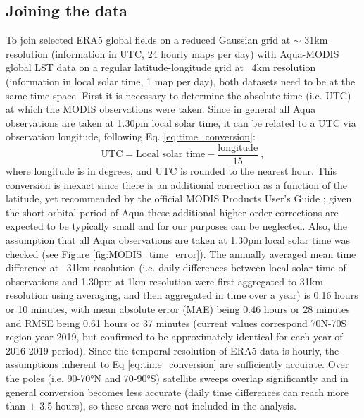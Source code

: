 \documentclass[hess, twostagejnl]{copernicus}
\begin{document}
\subsection{Joining the data}\label{sec:join}
To join selected ERA5 global fields on a reduced Gaussian grid at $\sim$ 31km resolution (information in UTC, 24 hourly maps per day) with Aqua-MODIS global LST data on a regular latitude-longitude grid at ~4km resolution (information in local solar time, 1 map per day), both datasets need to be at the same time space. First it is necessary to determine the absolute time (i.e. UTC) at which the MODIS observations were taken. Since in general all Aqua observations are taken at 1.30pm local solar time, it can be related to a UTC via observation longitude, following Eq. \ref{eq:time_conversion}:
\begin{equation}
	\text{UTC} = \text{Local solar time} - \frac{\text{longitude}}{15} \ , 
	\label{eq:time_conversion}
\end{equation}
where longitude is in degrees, and UTC is rounded to the nearest hour. This conversion is inexact since there is an additional correction as a function of the latitude, yet recommended by the official MODIS Products User’s Guide \citep{MODISusersguide}; given the short orbital period of Aqua these additional higher order corrections are expected to be typically small and for our purposes can be neglected. Also, the assumption that all Aqua observations are taken at 1.30pm local solar time was checked (see Figure \ref{fig:MODIS_time_error}). The annually averaged mean time difference at ~31km resolution (i.e. daily differences between local solar time of observations and 1.30pm at 1km resolution were first aggregated to 31km resolution using averaging, and then aggregated in time over a year) is 0.16 hours or 10 minutes, with mean absolute error (MAE) being 0.46 hours or 28 minutes and RMSE being 0.61 hours or 37 minutes (current values correspond 70N-70S region year 2019, but confirmed to be approximately identical for each year of 2016-2019 period). Since the temporal resolution of ERA5 data is hourly, the assumptions inherent to Eq \ref{eq:time_conversion} are sufficiently accurate. Over the poles (i.e. 90-70°N and 70-90°S) satellite sweeps overlap significantly and in general conversion becomes less accurate (daily time differences can reach more than $\pm$ 3.5 hours), so these areas were not included in the analysis. \newline 
\end{document}

